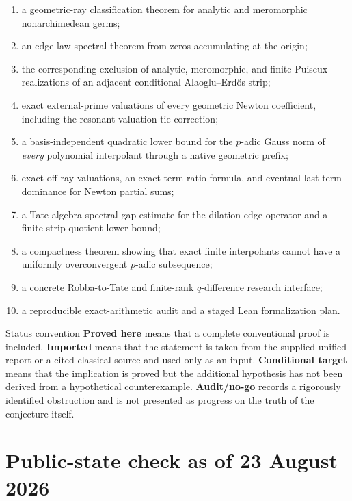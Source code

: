 \documentclass[11pt,oneside]{article}
\theoremstyle{definition}
\newcommand{\AEconj}{Alaoglu--Erd\H{o}s}
\begin{document}
\begin{enumerate}[label=\textbf{N\arabic*.}]
\item a geometric-ray classification theorem for analytic and meromorphic nonarchimedean
  germs;
\item an edge-law spectral theorem from zeros accumulating at the origin;
\item the corresponding exclusion of analytic, meromorphic, and finite-Puiseux realizations
  of an adjacent conditional \AEconj{} strip;
\item exact external-prime valuations of every geometric Newton coefficient, including the
  resonant valuation-tie correction;
\item a basis-independent quadratic lower bound for the $p$-adic Gauss norm of \emph{every}
  polynomial interpolant through a native geometric prefix;
\item exact off-ray valuations, an exact term-ratio formula, and eventual last-term dominance
  for Newton partial sums;
\item a Tate-algebra spectral-gap estimate for the dilation edge operator and a finite-strip
  quotient lower bound;
\item a compactness theorem showing that exact finite interpolants cannot have a uniformly
  overconvergent $p$-adic subsequence;
\item a concrete Robba-to-Tate and finite-rank $q$-difference research interface;
\item a reproducible exact-arithmetic audit and a staged Lean formalization plan.
\end{enumerate}

\begin{statusbox}{Status convention}
\textbf{Proved here} means that a complete conventional proof is included.  \textbf{Imported}
means that the statement is taken from the supplied unified report or a cited classical
source and used only as an input.  \textbf{Conditional target} means that the implication is
proved but the additional hypothesis has not been derived from a hypothetical
counterexample.  \textbf{Audit/no-go} records a rigorously identified obstruction and is not
presented as progress on the truth of the conjecture itself.
\end{statusbox}

\section{Public-state check as of 23 August 2026}
\label{sec:public-state}
\end{document}
